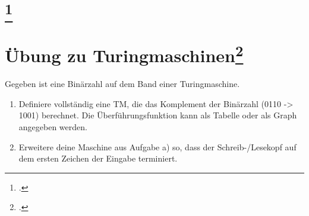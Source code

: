 \documentclass{lehramt-informatik-aufgabe}
\begin{document}
\section{
\footcite{theo:fs:3}}


\section{Übung zu Turingmaschinen\footcite[Seite 22]{theo:fs:3}}

Gegeben ist eine Binärzahl auf dem Band einer Turingmaschine.

\begin{enumerate}
\item Definiere vollständig eine TM, die das Komplement der Binärzahl
(0110 -> 1001) berechnet. Die Überführungsfunktion kann als Tabelle oder
als Graph angegeben werden.

\begin{liAntwort}
\end{liAntwort}

\item Erweitere deine Maschine aus Aufgabe a) so, dass der
Schreib-/Lesekopf auf dem ersten Zeichen der Eingabe terminiert.

\begin{liAntwort}
\end{liAntwort}
\end{enumerate}
\end{document}
